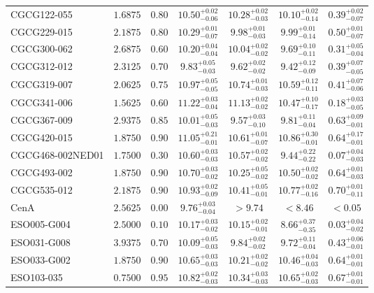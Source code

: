 \documentclass[onecolumn]{mn2e}
\begin{document}
{\begin{center}
\begin{longtable}{lcccccc}
CGCG122-055 & $1.6875$ & $0.80$ & $10.50_{-0.06}^{+0.02}$ & $10.28_{-0.03}^{+0.02}$ & $10.10_{-0.14}^{+0.02}$ &$0.39_{-0.07}^{+0.02}$ \\
CGCG229-015 & $2.1875$ & $0.80$ & $10.29_{-0.07}^{+0.01}$ & $9.98_{-0.03}^{+0.01}$ & $9.99_{-0.14}^{+0.01}$ &$0.50_{-0.07}^{+0.01}$ \\
CGCG300-062 & $2.6875$ & $0.60$ & $10.20_{-0.04}^{+0.04}$ & $10.04_{-0.02}^{+0.02}$ & $9.69_{-0.11}^{+0.10}$ &$0.31_{-0.04}^{+0.05}$ \\
CGCG312-012 & $2.3125$ & $0.70$ & $9.83_{-0.03}^{+0.05}$ & $9.62_{-0.02}^{+0.02}$ & $9.42_{-0.09}^{+0.12}$ &$0.39_{-0.05}^{+0.07}$ \\
CGCG319-007 & $2.0625$ & $0.75$ & $10.97_{-0.05}^{+0.05}$ & $10.74_{-0.03}^{+0.01}$ & $10.59_{-0.11}^{+0.12}$ &$0.41_{-0.06}^{+0.07}$ \\
CGCG341-006 & $1.5625$ & $0.60$ & $11.22_{-0.04}^{+0.03}$ & $11.13_{-0.02}^{+0.02}$ & $10.47_{-0.17}^{+0.10}$ &$0.18_{-0.05}^{+0.03}$ \\
CGCG367-009 & $2.9375$ & $0.85$ & $10.01_{-0.03}^{+0.05}$ & $9.57_{-0.10}^{+0.03}$ & $9.81_{-0.04}^{+0.11}$ &$0.63_{-0.01}^{+0.09}$ \\
CGCG420-015 & $1.8750$ & $0.90$ & $11.05_{-0.01}^{+0.21}$ & $10.61_{-0.07}^{+0.01}$ & $10.86_{-0.01}^{+0.30}$ &$0.64_{-0.01}^{+0.17}$ \\
CGCG468-002NED01 & $1.7500$ & $0.30$ & $10.60_{-0.03}^{+0.03}$ & $10.57_{-0.02}^{+0.02}$ & $9.44_{-0.22}^{+0.22}$ &$0.07_{-0.03}^{+0.04}$ \\
CGCG493-002 & $1.8750$ & $0.90$ & $10.70_{-0.02}^{+0.03}$ & $10.25_{-0.02}^{+0.05}$ & $10.50_{-0.02}^{+0.02}$ &$0.64_{-0.03}^{+0.01}$ \\
CGCG535-012 & $2.1875$ & $0.90$ & $10.93_{-0.09}^{+0.02}$ & $10.41_{-0.01}^{+0.05}$ & $10.77_{-0.16}^{+0.02}$ &$0.70_{-0.11}^{+0.01}$ \\
CenA & $2.5625$ & $0.00$ & $9.76_{-0.04}^{+0.03}$ & $>9.74$ & $<8.46$ &$<0.05$ \\
ESO005-G004 & $2.5000$ & $0.10$ & $10.17_{-0.02}^{+0.03}$ & $10.15_{-0.01}^{+0.02}$ & $8.66_{-0.35}^{+0.37}$ &$0.03_{-0.02}^{+0.04}$ \\
ESO031-G008 & $3.9375$ & $0.70$ & $10.09_{-0.03}^{+0.05}$ & $9.84_{-0.02}^{+0.02}$ & $9.72_{-0.04}^{+0.11}$ &$0.43_{-0.01}^{+0.06}$ \\
ESO033-G002 & $1.8750$ & $0.90$ & $10.65_{-0.03}^{+0.03}$ & $10.21_{-0.02}^{+0.02}$ & $10.46_{-0.03}^{+0.04}$ &$0.64_{-0.01}^{+0.01}$ \\
ESO103-035 & $0.7500$ & $0.95$ & $10.82_{-0.03}^{+0.02}$ & $10.34_{-0.03}^{+0.03}$ & $10.65_{-0.03}^{+0.02}$ &$0.67_{-0.01}^{+0.01}$ \\

\end{longtable}
\end{center}}
\end{document}
